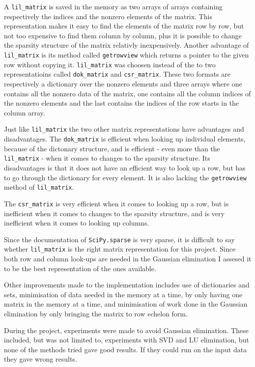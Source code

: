 \documentclass[11pt,a4paper,twoside]{report}
\begin{document}
A \texttt{lil\_matrix} is saved in the memory as two arrays of arrays containing respectively the indices and the nonzero elements of the matrix\cite{csr}. This representation makes it easy to find the elements of the matrix row by row, but not too expensive to find them column by column, plus it is possible to change the sparsity structure of the matrix relativly inexpensively. Another advantage of \texttt{lil\_matrix} is its method called \texttt{getrowview} which returns a pointer to the given row without copying it. \texttt{lil\_matrix} was choosen instead of the to two representatioins called \texttt{dok\_matrix} and \texttt{csr\_matrix}. These two formats are respectively a dictionary over the nonzero elements\cite{wikiSparse} and three arrays where one contains all the nonzero data of the matrix, one contains all the column indices of the nonzero elements and the last contains the indices of the row starts in the column array\cite{karlrupp}.

Just like \texttt{lil\_matrix} the two other matrix representations have advantages and disadvantages. The \texttt{dok\_matrix} is efficient when looking up individual elements, because of the dictonary structure, and is efficient - even more than the \texttt{lil\_matrix} - when it comes to changes to the sparsity structure. Its disadvantages is that it does not have an efficient way to look up a row, but has to go through the dictionary for every element. It is also lacking the \texttt{getrowview} method of \texttt{lil\_matrix}\cite{dok}. 

The \texttt{csr\_matrix} is very efficient when it comes to looking up a row, but is inefficient when it comes to changes to the sparsity structure, and is very inefficient when it comes to looking up columns\cite{csr}.

Since the documentation of \texttt{SciPy.sparse} is very sparse, it is difficult to say whether \texttt{lil\_matrix} is the right matrix representation for this project. Since both row and column look-ups are needed in the Gaussian elimination I assesed it to be the best representation of the ones available.

Other improvements made to the implementation includes use of dictionaries and sets, minimisation of data needed in the memory at a time, by only having one matrix in the memory at a time, and minimisation of work done in the Gaussian elimination by only bringing the matrix to row echelon form.

During the project, experiments were made to avoid Gaussian elimination. These included, but was not limited to, experiments with SVD and LU elimination, but none of the methods tried gave good results. If they could run on the input data they gave wrong results.
\end{document}
